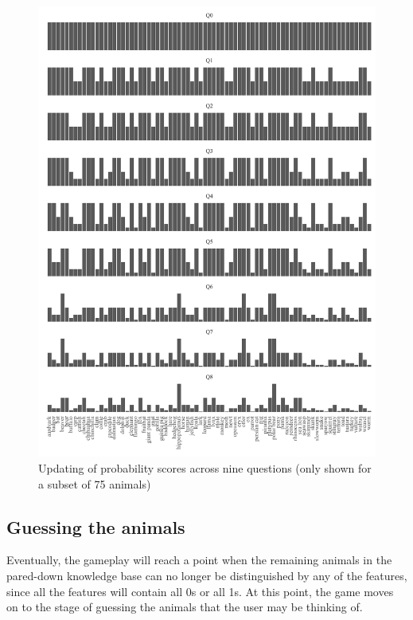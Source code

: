 \documentclass[11pt,a4paper]{article}
\begin{document}
\begin{figure}
	\includegraphics[width=\linewidth]{graphics/updating.pdf}
	\caption{Updating of probability scores across nine questions (only shown for a subset of 75 animals)}
	\label{fig:bayesian-update}
\end{figure}

\subsection{Guessing the animals}
\label{subsec:guess-animals}

Eventually, the gameplay will reach a point when the remaining animals in the pared-down knowledge base can no longer be distinguished by any of the features, since all the features will contain all 0s or all 1s.
At this point, the game moves on to the stage of guessing the animals that the user may be thinking of.
\end{document}
